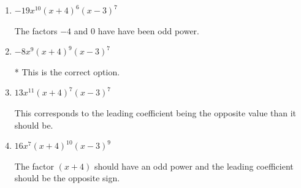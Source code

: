 \documentclass{extbook}[14pt]
\begin{document}
\begin{enumerate}
{\begin{enumerate}[label=\Alph*.]
The factor $-4$ should have been an odd power.
\item \( -19x^{10} (x + 4)^{6} (x - 3)^{7} \)

The factors $-4$ and $0$ have have been odd power.
\item \( -8x^{9} (x + 4)^{9} (x - 3)^{7} \)

* This is the correct option.
\item \( 13x^{11} (x + 4)^{7} (x - 3)^{7} \)

This corresponds to the leading coefficient being the opposite value than it should be.
\item \( 16x^{7} (x + 4)^{10} (x - 3)^{9} \)

The factor $(x + 4)$ should have an odd power and the leading coefficient should be the opposite sign.
\end{enumerate}

}
\end{enumerate}
\end{document}
